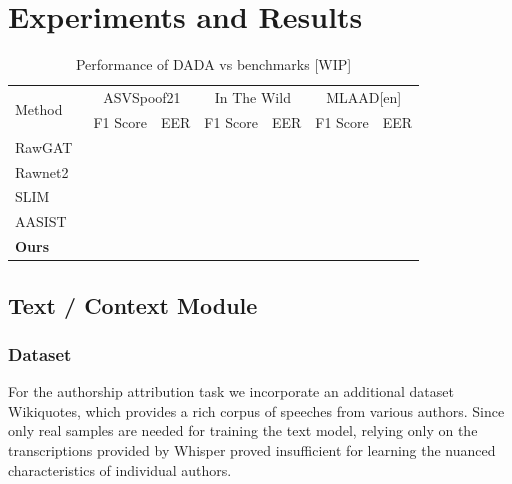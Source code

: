 \documentclass{Interspeech}
\begin{document}
\section{Experiments and Results}\label{sec:experiments_results}

\begin{table}[!htp]\centering
  \scriptsize
  \begin{tabular}{lcccccc}\toprule
    \multirow{2}{*}{Method} & \multicolumn{2}{c}{ASVSpoof21} & \multicolumn{2}{c}{In The Wild} & \multicolumn{2}{c}{MLAAD[en]}                        \\\cmidrule{2-7}
                            & F1 Score                       & EER                             & F1 Score                      & EER & F1 Score & EER \\\cmidrule{1-7}
    RawGAT~\cite{rawgat}    &                                &                                 &                               &     &          &     \\
    Rawnet2~\cite{rawnet2}  &                                &                                 &                               &     &          &     \\
    SLIM~\cite{slim}        &                                &                                 &                               &     &          &     \\
    AASIST~\cite{aasist}    &                                &                                 &                               &     &          &     \\
    \textbf{Ours}           &                                &                                 &                               &     &          &     \\\midrule
    \bottomrule
  \end{tabular}
  \caption{Performance of DADA vs benchmarks [WIP] }\label{tab:global_results}
\end{table}


\subsection{Text / Context Module}
\subsubsection{Dataset}
For the authorship attribution task we incorporate an additional dataset
Wikiquotes, which provides a rich corpus of speeches from various authors.
Since only real samples are needed for training the text model, relying only on
the transcriptions provided by Whisper proved insufficient for learning the
nuanced characteristics of individual authors. \\
\end{document}
